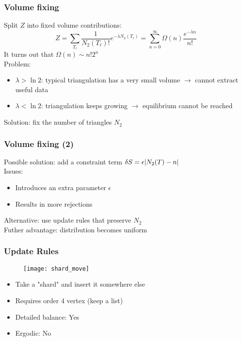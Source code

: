 
\begin{frame}
    \frametitle{Volume fixing}
    Split $Z$ into fixed volume contributions:
    \begin{equation}
        Z
        =
        \sum_{T_\ell} \frac{1}{N_2(T_\ell)!} e^{-\lambda N_2(T_\ell)}
        =
        \sum_{n = 0}^\infty \Omega(n) \frac{e^{-\lambda n}}{n!}
    \end{equation}
    It turns out that $\Omega(n) \sim n! 2^n$ \\
    Problem:
    \begin{itemize}
        \item $\lambda > \ln 2$: typical triangulation has a very small volume $\to$ cannot extract useful data
        \item $\lambda < \ln 2$: triangulation keeps growing $\to$ equilibrium cannot be reached
    \end{itemize}
    Solution: fix the number of triangles $N_2$
\end{frame}

\begin{frame}
    \frametitle{Volume fixing (2)}
    Possible solution: add a constraint term $\delta S = \epsilon \abs{N_2(T) - n}$ \\
    Issues:
    \begin{itemize}
        \item Introduces an extra parameter $\epsilon$
        \item Results in more rejections
    \end{itemize}
    Alternative: use update rules that preserve $N_2$ \\
    Futher advantage: distribution becomes uniform
\end{frame}

\begin{frame}
    \frametitle{Update Rules}
    \begin{figure}
        \centering
        \texttt{[image: shard\_move]}
    \end{figure}
    \begin{itemize}
        \item Take a "shard" and insert it somewhere else
        \item Requires order 4 vertex (keep a list)
        \item Detailed balance: Yes
        \item Ergodic: No
    \end{itemize}

\end{frame}

